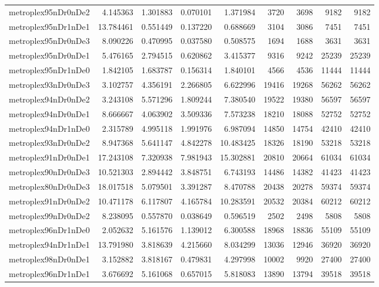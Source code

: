 \begin{longtable}{|l|r|r|r|r|r|r|r|r|}
metroplex95nDr0nDe2 & 4.145363 & 1.301883 & 0.070101 & 1.371984 & 3720 & 3698 & 9182 & 9182 \\
metroplex95nDr1nDe1 & 13.784461 & 0.551449 & 0.137220 & 0.688669 & 3104 & 3086 & 7451 & 7451 \\
metroplex95nDr0nDe3 & 8.090226 & 0.470995 & 0.037580 & 0.508575 & 1694 & 1688 & 3631 & 3631 \\
metroplex95nDr0nDe1 & 5.476165 & 2.794515 & 0.620862 & 3.415377 & 9316 & 9242 & 25239 & 25239 \\
metroplex95nDr1nDe0 & 1.842105 & 1.683787 & 0.156314 & 1.840101 & 4566 & 4536 & 11444 & 11444 \\
metroplex93nDr0nDe3 & 3.102757 & 4.356191 & 2.266805 & 6.622996 & 19416 & 19268 & 56262 & 56262 \\
metroplex94nDr0nDe2 & 3.243108 & 5.571296 & 1.809244 & 7.380540 & 19522 & 19380 & 56597 & 56597 \\
metroplex94nDr0nDe1 & 8.666667 & 4.063902 & 3.509336 & 7.573238 & 18210 & 18088 & 52752 & 52752 \\
metroplex94nDr1nDe0 & 2.315789 & 4.995118 & 1.991976 & 6.987094 & 14850 & 14754 & 42410 & 42410 \\
metroplex93nDr0nDe2 & 8.947368 & 5.641147 & 4.842278 & 10.483425 & 18326 & 18190 & 53218 & 53218 \\
metroplex91nDr0nDe1 & 17.243108 & 7.320938 & 7.981943 & 15.302881 & 20810 & 20664 & 61034 & 61034 \\
metroplex90nDr0nDe3 & 10.521303 & 2.894442 & 3.848751 & 6.743193 & 14486 & 14382 & 41423 & 41423 \\
metroplex80nDr0nDe3 & 18.017518 & 5.079501 & 3.391287 & 8.470788 & 20438 & 20278 & 59374 & 59374 \\
metroplex91nDr0nDe2 & 10.471178 & 6.117807 & 4.165784 & 10.283591 & 20532 & 20384 & 60212 & 60212 \\
metroplex99nDr0nDe2 & 8.238095 & 0.557870 & 0.038649 & 0.596519 & 2502 & 2498 & 5808 & 5808 \\
metroplex96nDr1nDe0 & 2.052632 & 5.161576 & 1.139012 & 6.300588 & 18968 & 18836 & 55109 & 55109 \\
metroplex94nDr1nDe1 & 13.791980 & 3.818639 & 4.215660 & 8.034299 & 13036 & 12946 & 36920 & 36920 \\
metroplex98nDr0nDe1 & 3.152882 & 3.818167 & 0.479831 & 4.297998 & 10002 & 9920 & 27400 & 27400 \\
metroplex96nDr1nDe1 & 3.676692 & 5.161068 & 0.657015 & 5.818083 & 13890 & 13794 & 39518 & 39518 \\

\end{longtable}
